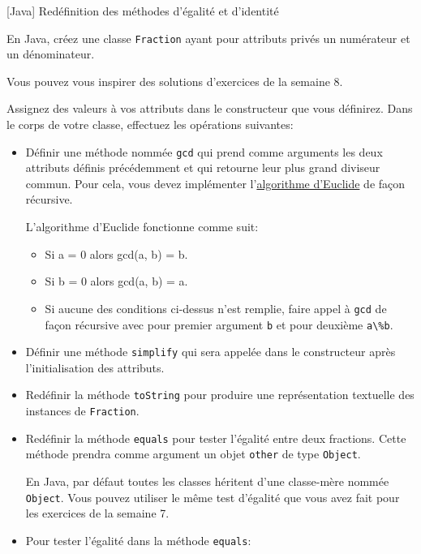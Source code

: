 \begin{Exercice}[30 minutes]{[Java] Redéfinition des méthodes d'égalité et d'identité}

En Java, créez une classe \lstinline{Fraction} ayant pour attributs privés un numérateur et un dénominateur. 
\begin{conseil}
	Vous pouvez vous inspirer des solutions d'exercices de la semaine 8.
\end{conseil}
Assignez des valeurs à vos attributs dans le constructeur que vous définirez. Dans le corps de votre classe, effectuez les opérations suivantes:
\begin{itemize}
	\item Définir une méthode nommée \lstinline{gcd} qui prend comme arguments les deux attributs définis précédemment et qui retourne leur plus grand diviseur commun. Pour cela, vous devez implémenter l'\href{https://fr.wikipedia.org/wiki/Algorithme_d%27Euclide#:~:text=le%20code%5D-,Principe}{algorithme d'Euclide} de façon récursive.
	\begin{conseil}
		L'algorithme d'Euclide fonctionne comme suit:
		\begin{itemize}
			\item Si a = 0 alors gcd(a, b) = b.
			\item Si b = 0 alors gcd(a, b) = a.
			\item Si aucune des conditions ci-dessus n'est remplie, faire appel à \lstinline{gcd} de façon récursive avec pour premier argument \lstinline{b} et pour deuxième \lstinline{a\%b}.
		\end{itemize}
	\end{conseil}
	\item Définir une méthode \lstinline{simplify} qui sera appelée dans le constructeur après l'initialisation des attributs. 
	\item Redéfinir la méthode \lstinline{toString} pour produire une représentation textuelle des instances de \lstinline{Fraction}.
	\item Redéfinir la méthode \lstinline{equals} pour tester l'égalité entre deux fractions. Cette méthode prendra comme argument un objet \lstinline{other} de type \lstinline{Object}.
	\begin{conseil}
		En Java, par défaut toutes les classes héritent d'une classe-mère nommée \lstinline{Object}. Vous pouvez utiliser le même test d'égalité que vous avez fait pour les exercices de la semaine 7.
	\end{conseil}
	\item  Pour tester l'égalité dans la méthode \lstinline{equals}:

\end{itemize}
\end{Exercice}
